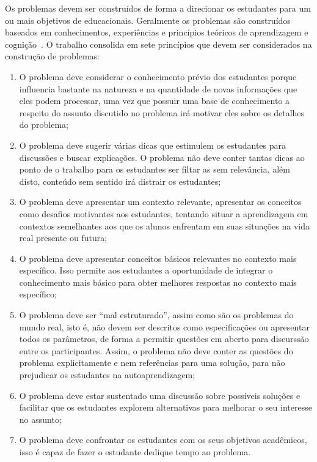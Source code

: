 Os problemas devem ser construídos de forma a
direcionar os estudantes
para um ou mais objetivos de educacionais.
Geralmente os problemas são construídos baseados em conhecimentos,
experiências e princípios teóricos de aprendizagem e
cognição~\cite{des1999delphi,dolmans1997seven}.
O trabalho \cite{dolmans1997seven} consolida em sete
princípios que devem ser considerados na construção
de problemas:

\begin{enumerate}
\item{O problema deve considerar o conhecimento
prévio dos estudantes porque influencia bastante na
natureza e na quantidade de novas informações que
eles podem processar, uma vez que possuir
uma base de conhecimento a respeito do assunto
discutido no problema irá motivar eles sobre os
detalhes do problema;}
\item{O problema deve sugerir várias dicas
que estimulem os estudantes para discussões
e buscar explicações. O problema não deve
conter tantas dicas ao ponto de o trabalho
para os estudantes ser filtar as sem relevância,
além disto, conteúdo sem sentido irá distrair
os estudantes;}
\item{O problema deve apresentar um contexto relevante,
apresentar os conceitos como desafios motivantes aos
estudantes, tentando situar a aprendizagem em contextos
semelhantes aos que os alunos enfrentam em suas
situações na vida real presente ou futura;}
\item{O problema deve apresentar conceitos básicos
relevantes no contexto mais específico.
Isso permite aos estudantes a oportunidade
de integrar o conhecimento mais básico para obter melhores
respostas no contexto mais específico;}
\item{O problema deve ser ``mal estruturado'', assim como
são os problemas do mundo real, isto é, não
devem ser descritos como especificações ou apresentar
todos os parâmetros, de forma a permitir questões em
aberto para discurssão entre os participantes.
Assim, o problema não deve conter as questões do problema
explicitamente e nem referências para uma solução,
para não prejudicar os estudantes na
autoaprendizagem;}
\item{O problema deve estar sustentado uma discussão
sobre possíveis soluções e facilitar que os estudantes
explorem alternativas para melhorar o seu interesse
no assunto;}
\item{O problema deve confrontar os estudantes com
os seus objetivos acadêmicos, isso é capaz de
fazer o estudante dedique tempo ao problema.}
\end{enumerate}


